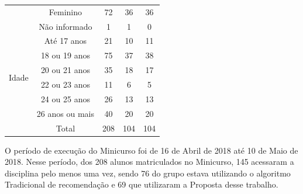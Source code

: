 \begin{table}[ht]
\begin{tabular}{ccccc}
                                        & Feminino                 & 72                                        & 36                   & 36                              \\
                                        & Não informado            & 1                                         & 1                    & 0                               \\
  \hline
  \multirow{6}{*}{Idade}                & Até 17 anos              & 21                                        & 10                   & 11                              \\
                                        & 18 ou 19 anos            & 75                                        & 37                   & 38                              \\
                                        & 20 ou 21 anos            & 35                                        & 18                   & 17                              \\
                                        & 22 ou 23 anos            & 11                                        & 6                    & 5                               \\
                                        & 24 ou 25 anos            & 26                                        & 13                   & 13                              \\
                                        & 26 anos ou mais          & 40                                        & 20                   & 20                              \\
  \hline
                                        & Total                    & 208                                       & 104                  & 104                             \\
  \hline
\end{tabular}
\end{table}

O período de execução do Minicurso foi de 16 de Abril de 2018 até 10 de Maio de 2018. Nesse período, dos 208 alunos
matriculados no Minicurso, 145 acessaram a disciplina pelo menos uma vez, sendo 76 do grupo estava
utilizando o algoritmo Tradicional de recomendação e 69 que utilizaram a Proposta desse trabalho.

